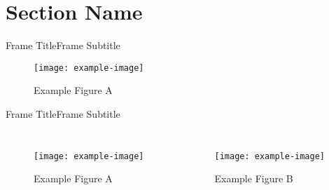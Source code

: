 \section{Section Name}
\graphicspath{{figs/section2/}} %

\begin{frame}{Frame Title}{Frame Subtitle}
	\begin{figure}
		\begin{center}
			\texttt{[image: example-image]}
			\caption{Example Figure A}
		\end{center}
	\end{figure}
\end{frame}

\begin{frame}{Frame Title}{Frame Subtitle}
	\begin{columns}
		\begin{figure}
			\begin{center}
				\texttt{[image: example-image]}
				\caption{Example Figure A}
			\end{center}
		\end{figure}
		\begin{figure}
			\begin{center}
				\texttt{[image: example-image]}
				\caption{Example Figure B}
			\end{center}
		\end{figure}
	\end{columns}
\end{frame}

